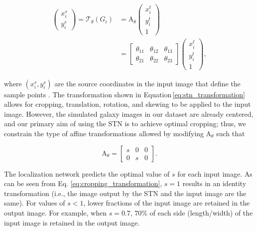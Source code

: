 \documentclass[twocolumn]{aastex63}
\begin{document}
\begin{CJK*}{UTF8}{gbsn}
\begin{equation}
\begin{split}
\left(\begin{array}{c}
x_{i}^{s} \\
y_{i}^{s}
\end{array}\right)=\mathcal{T}_{\theta}\left(G_{i}\right) & = \mathrm{A}_{\theta}\left(\begin{array}{c}
x_{i}^{t} \\
y_{i}^{t} \\
1
\end{array}\right) \\
& = \left[\begin{array}{lll}
\theta_{11} & \theta_{12} & \theta_{13} \\
\theta_{21} & \theta_{22} & \theta_{23}
\end{array}\right]\left(\begin{array}{c}
x_{i}^{t} \\
y_{i}^{t} \\
1
\end{array}\right) ,
\end{split}
\label{eq:stn_transformation}
\end{equation}

\noindent
where $ \left(x_i^s,y_i^s\right)$ are the source coordinates in the input image that define the sample points \citep{jarderberg_15}. The transformation shown in Equation\,\ref{eq:stn_transformation} allows for cropping, translation, rotation, and skewing to be applied to the input image. However, the simulated galaxy images in our dataset are already centered, and our primary aim of using the STN is to achieve optimal cropping; thus, we constrain the type of affine transformations allowed by modifying $\mathrm{A}_{\theta}$ such that 

\begin{equation}
\mathrm{A}_{\theta} = \left[\begin{array}{lll}
s & 0 & 0 \\
0 & s & 0
\end{array}\right] .
\label{eq:cropping_transformation}
\end{equation}

\noindent
The localization network predicts the optimal value of $s$ for each input image. As can be seen from Eq. \ref{eq:cropping_transformation}, $s=1$ results in an identity transformation (i.e., the image output by the STN and the input image are the same). For values of $s < 1$, lower fractions of the input image are retained in the output image. For example, when $s=0.7$, $70\%$ of each side (length/width) of the input image is retained in the output image.


\end{CJK*}
\end{document}
